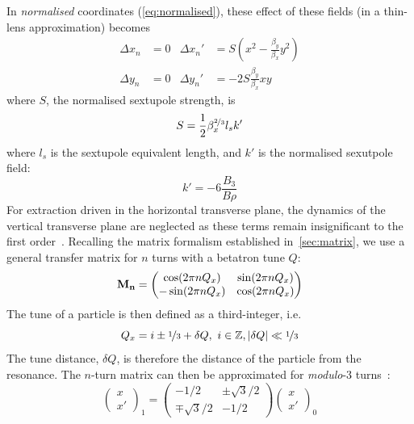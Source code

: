\documentclass[a4paper,twoside,11pt]{report}
\begin{document}
In \textit{normalised} coordinates (\autoref{eq:normalised}), these effect of these fields (in a thin-lens approximation) becomes
\begin{align*}
  \Delta x_n&=0 & \Delta x_n'&=S(x^2-\frac{\beta_y}{\beta_x}y^2) \\
  \Delta y_n&=0 & \Delta y_n'&=-2S\frac{\beta_y}{\beta_x}xy
\end{align*}
where $S$, the normalised sextupole strength, is
\begin{equation}
  S=\frac 12\beta_x^{\nicefrac 23}l_sk'
  \label{eq:normalised_sextupole_strength}
\end{equation} where $l_s$ is the sextupole equivalent length, and $k'$ is the normalised sexutpole field:
\begin{equation}
  k'=-6\frac{B_3}{B\rho}
\end{equation}
For extraction driven in the horizontal transverse plane, the dynamics of the vertical transverse plane are neglected as these terms remain insignificant to the first order~\cite[Ch 2.2]{PIMMS}. Recalling the matrix formalism established in~\autoref{sec:matrix}, we use a general transfer matrix for $n$ turns with a betatron tune $Q$:
\begin{equation}
  \bf M_n=
  \begin{pmatrix}
    \cos(2\pi nQ_x)  & \sin(2\pi nQ_x) \\
    -\sin(2\pi nQ_x) & \cos(2\pi nQ_x)
  \end{pmatrix}
\end{equation}
The tune of a particle is then defined as a third-integer, i.e.
\begin{equation}
  Q_x=i\pm\nicefrac 13 +\delta Q,\ i\in\mathbb{Z}, |\delta Q|\ll\nicefrac 13
\end{equation} 
The tune distance, $\delta Q$, is therefore the distance of the particle from the resonance. The $n$-turn matrix can then be approximated for \textit{modulo}-3 turns~\cite[Ch 2.4]{PIMMS}:
\begin{equation}
  \begin{pmatrix}
    x\\x'
  \end{pmatrix}_1=
  \begin{pmatrix}
    -1/2 & \pm\sqrt{3}/2 \\
    \mp\sqrt{3}/2 & -1/2
  \end{pmatrix}\begin{pmatrix}
    x\\x'
  \end{pmatrix}_0
\end{equation}
\end{document}
